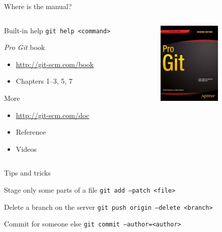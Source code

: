 \documentclass{beamer}
\begin{document}
\begin{frame}{Where is the manual?}
  \begin{columns}[t]
    \begin{column}{7cm}
      \begin{block}{Built-in help}
        \texttt{git help <command>}
      \end{block}
      \begin{block}{\emph{Pro Git} book}
        \begin{itemize}
        \item \url{http://git-scm.com/book}
        \item Chapters 1--3, 5, 7
        \end{itemize}
      \end{block}
      \begin{block}{More}
        \begin{itemize}
        \item \url{http://git-scm.com/doc}
        \item Reference
        \item Videos
        \end{itemize}
      \end{block}
    \end{column}
    \begin{column}{3cm}
      \begin{center}
        \includegraphics[width=3cm]{images/progit2.png}
      \end{center}
    \end{column}
  \end{columns}
\end{frame}

\begin{frame}{Tips and tricks}
  \begin{block}{Stage only some parts of a file}
    \texttt{git add --patch <file>}
  \end{block}
  \begin{block}{Delete a branch on the server}
    \texttt{git push origin --delete <branch>}
  \end{block}
  \begin{block}{Commit for someone else}
    \texttt{git commit --author=<author>}
  \end{block}
\end{frame}
\end{document}
